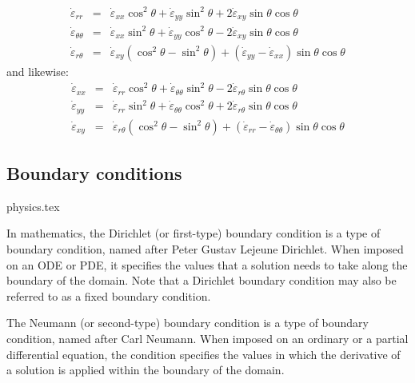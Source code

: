 \begin{eqnarray}
\dot{\varepsilon}_{rr} 
&=& \dot{\varepsilon}_{xx} \cos^2\theta + \dot{\varepsilon}_{yy} \sin^2\theta 
+ 2 \dot{\varepsilon}_{xy} \sin\theta\cos\theta \\
\dot{\varepsilon}_{\theta\theta}
&=& \dot{\varepsilon}_{xx} \sin^2\theta + \dot{\varepsilon}_{yy} \cos^2\theta 
- 2 \dot{\varepsilon}_{xy} \sin\theta\cos\theta \\
\dot{\varepsilon}_{r\theta} 
&=& \dot{\varepsilon}_{xy} (\cos^2\theta-\sin^2\theta) + 
(\dot{\varepsilon}_{yy} - \dot{\varepsilon}_{xx})\sin\theta \cos\theta
\end{eqnarray}
and likewise:
\begin{eqnarray}
\dot{\varepsilon}_{xx} 
&=& \dot{\varepsilon}_{rr} \cos^2\theta + \dot{\varepsilon}_{\theta\theta} \sin^2\theta - 2 \dot{\varepsilon}_{r\theta} \sin\theta\cos\theta \\
\dot{\varepsilon}_{yy}
&=& \dot{\varepsilon}_{rr} \sin^2\theta + \dot{\varepsilon}_{\theta\theta} \cos^2\theta + 2 \dot{\varepsilon}_{r\theta} \sin\theta\cos\theta \\
\dot{\varepsilon}_{xy} 
&=& \dot{\varepsilon}_{r\theta} (\cos^2\theta-\sin^2\theta) + 
(\dot{\varepsilon}_{rr} - \dot{\varepsilon}_{\theta\theta})\sin\theta \cos\theta \label{ss:srboth}
\end{eqnarray}



\newpage
\subsection{Boundary conditions}
\begin{flushright} {\tiny {\color{gray} physics.tex}} \end{flushright}

In mathematics, the Dirichlet (or first-type) 
boundary condition is a type of boundary condition, named after Peter Gustav Lejeune Dirichlet.
When imposed on an ODE or PDE, it specifies the values that a solution needs 
to take along the boundary of the domain.
Note that a Dirichlet boundary condition may also be referred to as a fixed boundary condition. 

The Neumann (or second-type) boundary condition is a type of boundary condition, 
named after Carl Neumann. When imposed on an ordinary or a partial differential equation, 
the condition specifies the values in which the derivative of a solution is 
applied within the boundary of the domain.


